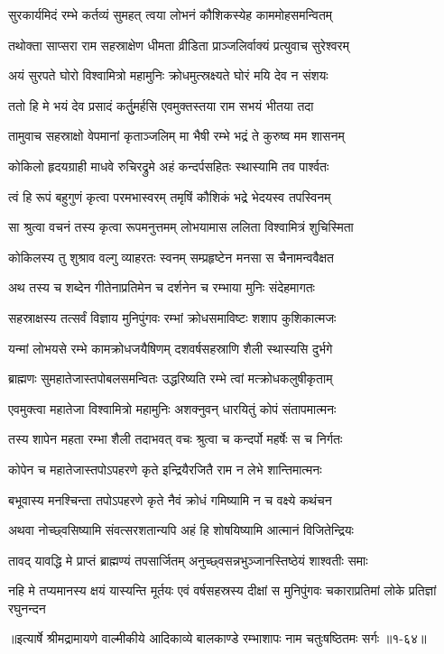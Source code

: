 
\twolineshloka
{सुरकार्यमिदं रम्भे कर्तव्यं सुमहत् त्वया}
{लोभनं कौशिकस्येह काममोहसमन्वितम्} %

\twolineshloka
{तथोक्ता साप्सरा राम सहस्राक्षेण धीमता}
{व्रीडिता प्राञ्जलिर्वाक्यं प्रत्युवाच सुरेश्वरम्} %

\twolineshloka
{अयं सुरपते घोरो विश्वामित्रो महामुनिः}
{क्रोधमुत्स्रक्ष्यते घोरं मयि देव न संशयः} %

\twolineshloka
{ततो हि मे भयं देव प्रसादं कर्तुुमर्हसि}
{एवमुक्तस्तया राम सभयं भीतया तदा} %

\twolineshloka
{तामुवाच सहस्राक्षो वेपमानां कृताञ्जलिम्}
{मा भैषी रम्भे भद्रं ते कुरुष्व मम शासनम्} %

\twolineshloka
{कोकिलो हृदयग्राही माधवे रुचिरद्रुमे}
{अहं कन्दर्पसहितः स्थास्यामि तव पार्श्वतः} %

\twolineshloka
{त्वं हि रूपं बहुगुणं कृत्वा परमभास्वरम्}
{तमृषिं कौशिकं भद्रे भेदयस्व तपस्विनम्} %

\twolineshloka
{सा श्रुत्वा वचनं तस्य कृत्वा रूपमनुत्तमम्}
{लोभयामास ललिता विश्वामित्रं शुचिस्मिता} %

\twolineshloka
{कोकिलस्य तु शुश्राव वल्गु व्याहरतः स्वनम्}
{सम्प्रहृष्टेन मनसा स चैनामन्ववैक्षत} %

\twolineshloka
{अथ तस्य च शब्देन गीतेनाप्रतिमेन च}
{दर्शनेन च रम्भाया मुनिः संदेहमागतः} %

\twolineshloka
{सहस्राक्षस्य तत्सर्वं विज्ञाय मुनिपुंगवः}
{रम्भां क्रोधसमाविष्टः शशाप कुशिकात्मजः} %

\twolineshloka
{यन्मां लोभयसे रम्भे कामक्रोधजयैषिणम्}
{दशवर्षसहस्राणि शैली स्थास्यसि दुर्भगे} %

\twolineshloka
{ब्राह्मणः सुमहातेजास्तपोबलसमन्वितः}
{उद्धरिष्यति रम्भे त्वां मत्क्रोधकलुषीकृताम्} %

\twolineshloka
{एवमुक्त्वा महातेजा विश्वामित्रो महामुनिः}
{अशक्नुवन् धारयितुं कोपं संतापमात्मनः} %

\twolineshloka
{तस्य शापेन महता रम्भा शैली तदाभवत्}
{वचः श्रुत्वा च कन्दर्पो महर्षेः स च निर्गतः} %

\twolineshloka
{कोपेन च महातेजास्तपोऽपहरणे कृते}
{इन्द्रियैरजितै राम न लेभे शान्तिमात्मनः} %

\twolineshloka
{बभूवास्य मनश्चिन्ता तपोऽपहरणे कृते}
{नैवं क्रोधं गमिष्यामि न च वक्ष्ये कथंचन} %

\twolineshloka
{अथवा नोच्छ्वसिष्यामि संवत्सरशतान्यपि}
{अहं हि शोषयिष्यामि आत्मानं विजितेन्द्रियः} %

\twolineshloka
{तावद् यावद्धि मे प्राप्तं ब्राह्मण्यं तपसार्जितम्}
{अनुच्छ्वसन्नभुञ्जानस्तिष्ठेयं शाश्वतीः समाः} %

\threelineshloka
{नहि मे तप्यमानस्य क्षयं यास्यन्ति मूर्तयः}
{एवं वर्षसहस्रस्य दीक्षां स मुनिपुंगवः}
{चकाराप्रतिमां लोके प्रतिज्ञां रघुनन्दन} %


॥इत्यार्षे श्रीमद्रामायणे वाल्मीकीये आदिकाव्ये बालकाण्डे रम्भाशापः नाम चतुःषष्ठितमः सर्गः ॥१-६४॥
